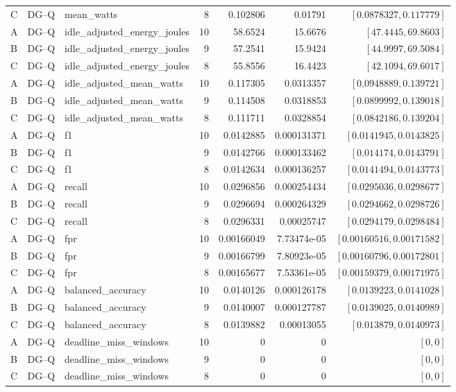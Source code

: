 \begin{longtable}{lllrrrr}
C & DG--Q & mean\_watts & 8 & 0.102806 & 0.01791 & $[0.0878327,0.117779]$\\
A & DG--Q & idle\_adjusted\_energy\_joules & 10 & 58.6524 & 15.6676 & $[47.4445,69.8603]$\\
B & DG--Q & idle\_adjusted\_energy\_joules & 9 & 57.2541 & 15.9424 & $[44.9997,69.5084]$\\
C & DG--Q & idle\_adjusted\_energy\_joules & 8 & 55.8556 & 16.4423 & $[42.1094,69.6017]$\\
A & DG--Q & idle\_adjusted\_mean\_watts & 10 & 0.117305 & 0.0313357 & $[0.0948889,0.139721]$\\
B & DG--Q & idle\_adjusted\_mean\_watts & 9 & 0.114508 & 0.0318853 & $[0.0899992,0.139018]$\\
C & DG--Q & idle\_adjusted\_mean\_watts & 8 & 0.111711 & 0.0328854 & $[0.0842186,0.139204]$\\
A & DG--Q & f1 & 10 & 0.0142885 & 0.000131371 & $[0.0141945,0.0143825]$\\
B & DG--Q & f1 & 9 & 0.0142766 & 0.000133462 & $[0.014174,0.0143791]$\\
C & DG--Q & f1 & 8 & 0.0142634 & 0.000136257 & $[0.0141494,0.0143773]$\\
A & DG--Q & recall & 10 & 0.0296856 & 0.000254434 & $[0.0295036,0.0298677]$\\
B & DG--Q & recall & 9 & 0.0296694 & 0.000264329 & $[0.0294662,0.0298726]$\\
C & DG--Q & recall & 8 & 0.0296331 & 0.00025747 & $[0.0294179,0.0298484]$\\
A & DG--Q & fpr & 10 & 0.00166049 & 7.73474e-05 & $[0.00160516,0.00171582]$\\
B & DG--Q & fpr & 9 & 0.00166799 & 7.80923e-05 & $[0.00160796,0.00172801]$\\
C & DG--Q & fpr & 8 & 0.00165677 & 7.53361e-05 & $[0.00159379,0.00171975]$\\
A & DG--Q & balanced\_accuracy & 10 & 0.0140126 & 0.000126178 & $[0.0139223,0.0141028]$\\
B & DG--Q & balanced\_accuracy & 9 & 0.0140007 & 0.000127787 & $[0.0139025,0.0140989]$\\
C & DG--Q & balanced\_accuracy & 8 & 0.0139882 & 0.00013055 & $[0.013879,0.0140973]$\\
A & DG--Q & deadline\_miss\_windows & 10 & 0 & 0 & $[0,0]$\\
B & DG--Q & deadline\_miss\_windows & 9 & 0 & 0 & $[0,0]$\\
C & DG--Q & deadline\_miss\_windows & 8 & 0 & 0 & $[0,0]$\\

\end{longtable}
